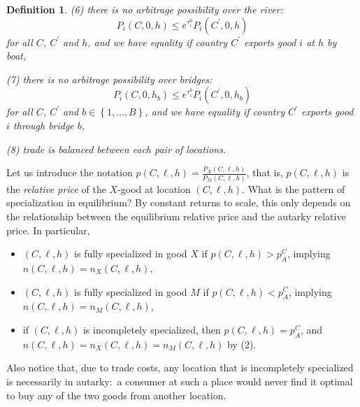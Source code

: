 \documentclass[12pt]{article}
\newtheorem{definition}{Definition}
\begin{document}
\begin{definition}
(6) there is no arbitrage possibility over the river:%
\begin{equation*}
P_{i}\left( C,0,h\right) \leq e^{\tau _{i}^{0}}P_{i}\left( C^{\prime
},0,h\right)
\end{equation*}%
for all $C$, $C^{\prime }$ and $h$, and we have equality if country $%
C^{\prime }$ exports good $i$ at $h$ by boat,

(7) there is no arbitrage possibility over bridges:%
\begin{equation*}
P_{i}\left( C,0,h_{b}\right) \leq e^{\tau _{i}^{b}}P_{i}\left( C^{\prime
},0,h_{b}\right)
\end{equation*}%
for all $C$, $C^{\prime }$ and $b\in \left \{ 1,\ldots ,B\right \} $, and we
have equality if country $C^{\prime }$ exports good $i$ through bridge $b$,

(8) trade is balanced between each pair of locations.
\end{definition}

Let us introduce the notation $p\left( C,\ell ,h\right) =\frac{P_{X}\left(
C,\ell ,h\right) }{P_{M}\left( C,\ell ,h\right) }$, that is, $p\left( C,\ell
,h\right) $ is the \textit{relative price} of the $X$-good at location $%
\left( C,\ell ,h\right) $. What is the pattern of specialization in
equilibrium? By constant returns to scale, this only depends on the
relationship between the equilibrium relative price and the autarky
relative price. In particular,

\begin{itemize}
\item $\left( C,\ell ,h\right) $ is fully specialized in good $X$ if $%
p\left( C,\ell ,h\right) >p_{A}^{C}$, implying $n\left( C,\ell ,h\right)
=n_{X}\left( C,\ell ,h\right) $,

\item $\left( C,\ell ,h\right) $ is fully specialized in good $M$ if $%
p\left( C,\ell ,h\right) <p_{A}^{C}$, implying $n\left( C,\ell ,h\right)
=n_{M}\left( C,\ell ,h\right) $,

\item if $\left( C,\ell ,h\right) $ is incompletely specialized, then $%
p\left( C,\ell ,h\right) =p_{A}^{C}$, and $n\left( C,\ell ,h\right)
=n_{X}\left( C,\ell ,h\right) =n_{M}\left( C,\ell ,h\right) $ by (2).
\end{itemize}

Also notice that, due to trade costs, any location that is incompletely
specialized is necessarily in autarky:\ a consumer at such a place would
never find it optimal to buy any of the two goods from another location.
\end{document}
